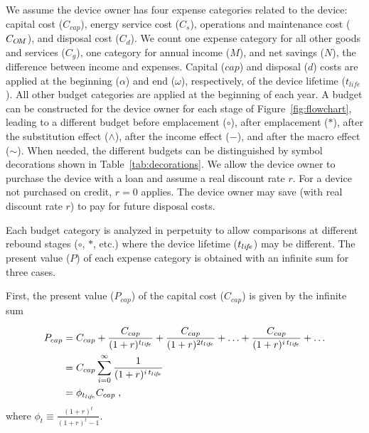 
We assume the device owner has four expense categories 
related to the device:
capital cost ($C_{cap}$), 
energy service cost ($C_s$), 
operations and maintenance cost ($C_{O\!M}$), and
disposal cost ($C_d$).
We count one expense category for all other
goods and services ($C_g$),
one category for annual income ($M$), and 
net savings ($N$), 
the difference between income and expenses.
Capital ($cap$) and disposal ($d$) costs are applied
at the beginning ($\alpha$) and end ($\omega$), respectively, 
of the device lifetime ($t_{life}$).
All other budget categories are 
applied at the beginning of each year.
A budget can be constructed for the device owner for each stage
of Figure~\ref{fig:flowchart}, 
leading to a different budget 
before emplacement ($\circ$), 
after emplacement ($*$), 
after the substitution effect ($\wedge$), 
after the income effect ($-$), and 
after the macro effect ($\sim$).
When needed, 
the different budgets can be distinguished by symbol decorations
shown in Table~\ref{tab:decorations}.
We allow the device owner to purchase the device 
with a loan and assume a real discount rate $r$.
For a device not purchased on credit,
$r = 0$ applies.
The device owner may save (with real discount rate $r$)
to pay for future disposal costs.

Each budget category is analyzed in perpetuity
to allow comparisons at different rebound stages 
($\circ$, $*$, etc.)
where the device lifetime ($t_{li\!f\!e}$) may be different.
The present value ($P$) of each expense category is obtained
with an infinite sum for three cases.

First, the present value ($P_{cap}$) of the capital cost ($C_{cap}$) 
is given by the infinite sum 

\begin{align}
\footnotesize{}
  P_{cap} &= C_{cap} + \frac{C_{cap}}{(1 + r)^{\tlife}} + \frac{C_{cap}}{(1 + r)^{2 \tlife}} +
             \ldots + \frac{C_{cap}}{(1 + r)^{\itlife}} + \ldots \nonumber \\
          &= C_{cap} \sum_{i = 0}^{\infty} \frac{1}{(1 + r)^{\itlife}} \nonumber \\
          &= \phi_{\tlife} C_{cap} \; ,
\end{align}
%
where $\phi_t \equiv \frac{(1 + r)^t}{(1 + r)^t - 1}$.

